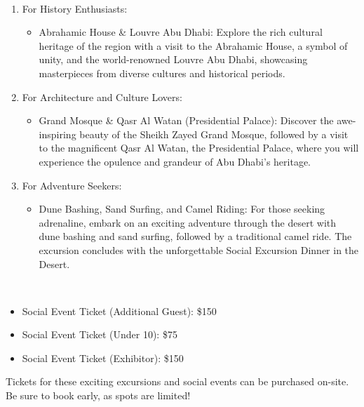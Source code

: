 \\ 
\begin{enumerate}[noitemsep]
  \item For History Enthusiasts:
  \begin{itemize}[noitemsep]
    \item Abrahamic House \& Louvre Abu Dhabi: Explore the rich cultural heritage of the region with a visit to the Abrahamic House, a symbol of unity, and the world-renowned Louvre Abu Dhabi, showcasing masterpieces from diverse cultures and historical periods.
  \end{itemize}
  \item For Architecture and Culture Lovers:
  \begin{itemize}[noitemsep]
    \item Grand Mosque \& Qasr Al Watan (Presidential Palace): Discover the awe-inspiring beauty of the Sheikh Zayed Grand Mosque, followed by a visit to the magnificent Qasr Al Watan, the Presidential Palace, where you will experience the opulence and grandeur of Abu Dhabi's heritage.
  \end{itemize}
  \item For Adventure Seekers:
  \begin{itemize}[noitemsep]
    \item Dune Bashing, Sand Surfing, and Camel Riding: For those seeking adrenaline, embark on an exciting adventure through the desert with dune bashing and sand surfing, followed by a traditional camel ride. The excursion concludes with the unforgettable Social Excursion Dinner in the Desert.
  \end{itemize}
\end{enumerate}
\noindent\hrulefill\\
\begin{itemize}[noitemsep]
\item Social Event Ticket (Additional Guest): \$150
\item Social Event Ticket (Under 10): \$75
\item Social Event Ticket (Exhibitor): \$150
\end{itemize}
Tickets for these exciting excursions and social events can be purchased on-site. Be sure to book early, as spots are limited!
\newpage
